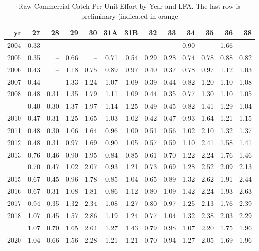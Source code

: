 \documentclass[
]{article}
\begin{document}
\newpage
\begin{table}

\caption{\label{tab:unnamed-chunk-13}Raw Commercial Catch Per Unit Effort by Year and LFA. The last row is preliminary (indicated in orange}
\centering
\begin{tabular}[t]{rrrrrrrrrrrrr}
\toprule
yr & 27 & 28 & 29 & 30 & 31A & 31B & 32 & 33 & 34 & 35 & 36 & 38\\
\midrule
2004 & 0.33 & -- & -- & -- & -- & -- & -- & -- & 0.90 & -- & 1.66 & --\\
2005 & 0.35 & -- & 0.66 & -- & 0.71 & 0.54 & 0.29 & 0.28 & 0.74 & 0.78 & 0.88 & 0.82\\
2006 & 0.43 & -- & 1.18 & 0.75 & 0.89 & 0.97 & 0.40 & 0.37 & 0.78 & 0.97 & 1.12 & 1.03\\
2007 & 0.44 & -- & 1.33 & 1.24 & 1.07 & 1.09 & 0.39 & 0.44 & 0.82 & 1.20 & 1.10 & 1.08\\
2008 & 0.48 & 0.31 & 1.35 & 1.79 & 1.11 & 1.09 & 0.44 & 0.35 & 0.77 & 1.30 & 1.10 & 1.05\\
\addlinespace
2009 & 0.40 & 0.30 & 1.37 & 1.97 & 1.14 & 1.25 & 0.49 & 0.45 & 0.82 & 1.41 & 1.29 & 1.04\\
2010 & 0.47 & 0.31 & 1.25 & 1.65 & 1.03 & 1.02 & 0.42 & 0.47 & 0.93 & 1.64 & 1.21 & 1.15\\
2011 & 0.48 & 0.30 & 1.06 & 1.64 & 0.96 & 1.00 & 0.51 & 0.56 & 1.02 & 2.10 & 1.32 & 1.37\\
2012 & 0.48 & 0.31 & 0.97 & 1.69 & 0.90 & 1.05 & 0.57 & 0.59 & 1.10 & 2.41 & 1.58 & 1.41\\
2013 & 0.76 & 0.46 & 0.90 & 1.95 & 0.84 & 0.85 & 0.61 & 0.70 & 1.22 & 2.24 & 1.76 & 1.46\\
\addlinespace
2014 & 0.70 & 0.47 & 1.02 & 2.07 & 0.93 & 1.21 & 0.73 & 0.69 & 1.28 & 2.52 & 2.09 & 2.13\\
2015 & 0.67 & 0.45 & 0.96 & 1.78 & 0.85 & 1.04 & 0.65 & 0.89 & 1.32 & 2.62 & 1.91 & 2.44\\
2016 & 0.67 & 0.31 & 1.08 & 1.81 & 0.86 & 1.12 & 0.80 & 1.09 & 1.42 & 2.24 & 1.93 & 2.63\\
2017 & 0.94 & 0.35 & 1.32 & 2.34 & 1.08 & 1.27 & 0.80 & 0.97 & 1.25 & 2.13 & 1.76 & 2.39\\
2018 & 1.07 & 0.45 & 1.57 & 2.86 & 1.19 & 1.24 & 0.77 & 1.04 & 1.32 & 2.38 & 2.03 & 2.29\\
\addlinespace
2019 & 1.07 & 0.70 & 1.65 & 2.64 & 1.27 & 1.43 & 0.79 & 0.98 & 1.07 & 2.20 & 1.75 & 1.96\\
2020 & 1.04 & 0.66 & 1.56 & 2.28 & 1.21 & 1.21 & 0.70 & 0.94 & 1.27 & 2.05 & 1.69 & 1.96\\

\end{tabular}
\end{table}
\end{document}
